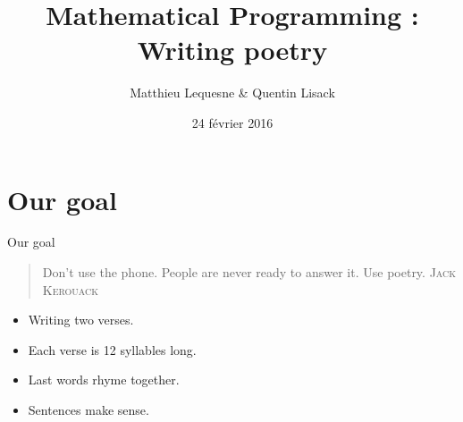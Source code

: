 \documentclass[unknownkeysallowed]{beamer}
\title{Mathematical Programming : Writing poetry}	%
\author{Matthieu Lequesne \& Quentin Lisack}						%
\institute{École polytechnique}					%
\date[]{24 février 2016}
\begin{document}
{
\frame[plain]{\titlepage}
}







\section{Our goal}

\begin{frame}{Our goal}


\begin{quote}
\og Don’t use the phone. People are never ready to answer it. Use poetry. \fg
\flushright \textsc{Jack Kerouack}
\end{quote}

\begin{itemize}
\item Writing two verses.
\item Each verse is 12 syllables long.
\item Last words rhyme together.
\item Sentences make sense.
\end{itemize}
\end{frame}
\end{document}
